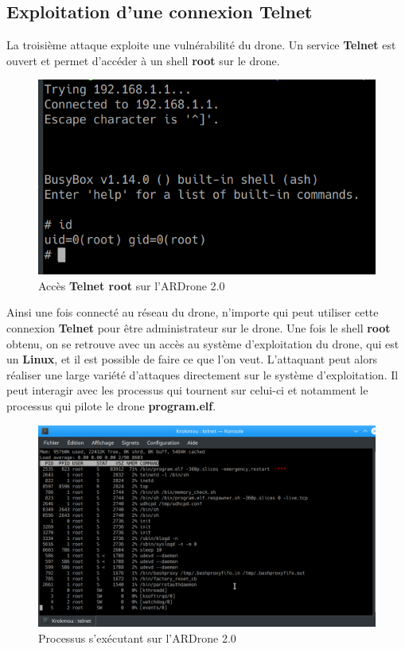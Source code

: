 \subsection{Exploitation d'une connexion Telnet}
La troisième attaque exploite une vulnérabilité du drone. Un service \textbf{Telnet} est ouvert et permet d'accéder à un shell \textbf{root} sur le drone.

\begin{figure}[H]
  \centering
  \includegraphics[scale=0.7]{images/root.png}
  \caption{Accès \textbf{Telnet root} sur l'ARDrone 2.0}
\end{figure}

Ainsi une fois connecté au réseau du drone, n'importe qui peut utiliser cette connexion \textbf{Telnet} pour être administrateur sur le drone. Une fois le shell \textbf{root} obtenu, on se retrouve avec un accès au système d'exploitation du drone, qui est un \textbf{Linux}, et il est possible de faire ce que l'on veut. L'attaquant peut alors réaliser une large variété d'attaques directement sur le système d'exploitation. Il peut interagir avec les processus qui tournent sur celui-ci et notamment le processus qui pilote le drone \textbf{program.elf}.

\begin{figure}[H]
  \centering
  \includegraphics[scale=0.35]{images/processus.png}
  \caption{Processus s'exécutant sur l'ARDrone 2.0}
\end{figure}

